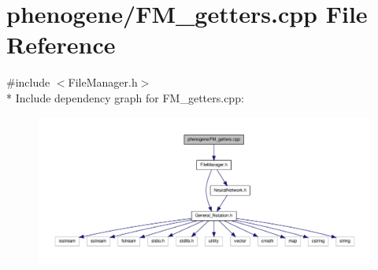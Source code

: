 \hypertarget{a00006}{\section{phenogene/\-F\-M\-\_\-getters.cpp File Reference}
\label{de/d21/a00006}
}
{\ttfamily \#include $<$File\-Manager.\-h$>$}\\*
Include dependency graph for F\-M\-\_\-getters.\-cpp\-:\nopagebreak
\begin{figure}[H]
\begin{center}
\leavevmode
\includegraphics[width=350pt]{d3/dfe/a00025}
\end{center}
\end{figure}
